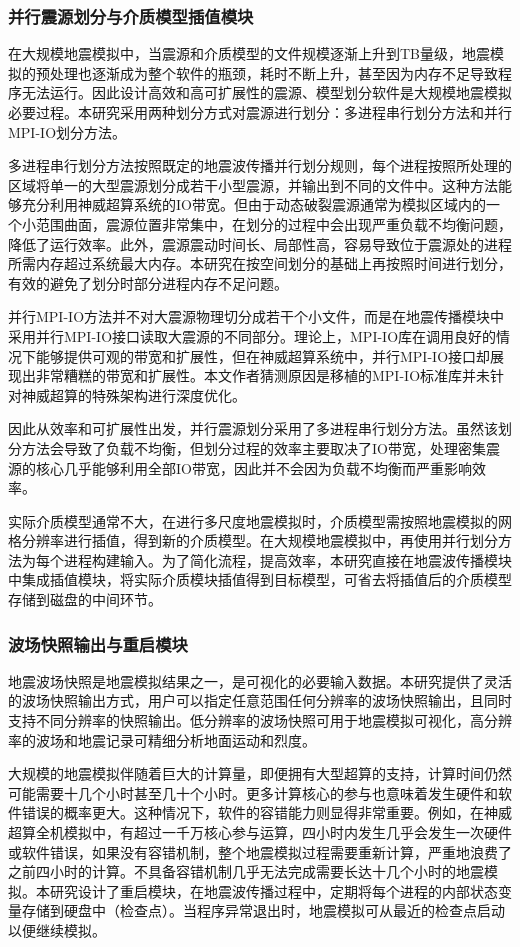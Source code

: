 \subsubsection{并行震源划分与介质模型插值模块}
\label{sub:并行震源划分与介质模型插值模块}
在大规模地震模拟中，当震源和介质模型的文件规模逐渐上升到TB量级，地震模拟的预处理也逐渐成为整个软件的瓶颈，耗时不断上升，甚至因为内存不足导致程序无法运行。因此设计高效和高可扩展性的震源、模型划分软件是大规模地震模拟必要过程。本研究采用两种划分方式对震源进行划分：多进程串行划分方法和并行MPI-IO划分方法。

多进程串行划分方法按照既定的地震波传播并行划分规则，每个进程按照所处理的区域将单一的大型震源划分成若干小型震源，并输出到不同的文件中。这种方法能够充分利用神威超算系统的IO带宽。但由于动态破裂震源通常为模拟区域内的一个小范围曲面，震源位置非常集中，在划分的过程中会出现严重负载不均衡问题，降低了运行效率。此外，震源震动时间长、局部性高，容易导致位于震源处的进程所需内存超过系统最大内存。本研究在按空间划分的基础上再按照时间进行划分，有效的避免了划分时部分进程内存不足问题。

并行MPI-IO方法并不对大震源物理切分成若干个小文件，而是在地震传播模块中采用并行MPI-IO接口读取大震源的不同部分。理论上，MPI-IO库在调用良好的情况下能够提供可观的带宽和扩展性，但在神威超算系统中，并行MPI-IO接口却展现出非常糟糕的带宽和扩展性。本文作者猜测原因是移植的MPI-IO标准库并未针对神威超算的特殊架构进行深度优化。

因此从效率和可扩展性出发，并行震源划分采用了多进程串行划分方法。虽然该划分方法会导致了负载不均衡，但划分过程的效率主要取决了IO带宽，处理密集震源的核心几乎能够利用全部IO带宽，因此并不会因为负载不均衡而严重影响效率。

实际介质模型通常不大，在进行多尺度地震模拟时，介质模型需按照地震模拟的网格分辨率进行插值，得到新的介质模型。在大规模地震模拟中，再使用并行划分方法为每个进程构建输入。为了简化流程，提高效率，本研究直接在地震波传播模块中集成插值模块，将实际介质模块插值得到目标模型，可省去将插值后的介质模型存储到磁盘的中间环节。

\subsubsection{波场快照输出与重启模块}
地震波场快照是地震模拟结果之一，是可视化的必要输入数据。本研究提供了灵活的波场快照输出方式，用户可以指定任意范围任何分辨率的波场快照输出，且同时支持不同分辨率的快照输出。低分辨率的波场快照可用于地震模拟可视化，高分辨率的波场和地震记录可精细分析地面运动和烈度。

大规模的地震模拟伴随着巨大的计算量，即便拥有大型超算的支持，计算时间仍然可能需要十几个小时甚至几十个小时。更多计算核心的参与也意味着发生硬件和软件错误的概率更大。这种情况下，软件的容错能力则显得非常重要。例如，在神威超算全机模拟中，有超过一千万核心参与运算，四小时内发生几乎会发生一次硬件或软件错误，如果没有容错机制，整个地震模拟过程需要重新计算，严重地浪费了之前四小时的计算。不具备容错机制几乎无法完成需要长达十几个小时的地震模拟。本研究设计了重启模块，在地震波传播过程中，定期将每个进程的内部状态变量存储到硬盘中（检查点）。当程序异常退出时，地震模拟可从最近的检查点启动以便继续模拟。

